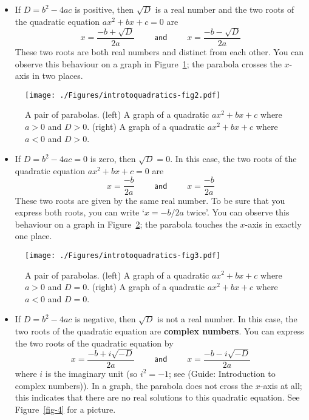 \documentclass[
  12pt,
  a4paper, oneside]{starmastarticle}
\providecommand{\tightlist}{%
  \setlength{\itemsep}{0pt}\setlength{\parskip}{0pt}}\usepackage{longtable,booktabs,array}
\begin{document}
\begin{itemize}
\tightlist
\item
  If \(D = b^2 - 4ac\) is positive, then \(\sqrt{D}\) is a real number
  and the two roots of the quadratic equation \(ax^2 + bx + c = 0\) are
  \[x = \frac{-b + \sqrt{D}}{2a}\qquad\textsf{ and }\qquad x = \frac{-b - \sqrt{D}}{2a}\]
  These two roots are both real numbers and distinct from each other.
  You can observe this behaviour on a graph in Figure~\ref{fig-2}; the
  parabola crosses the \(x\)-axis in two places.
\end{itemize}

\begin{figure}

{\centering \texttt{[image: ./Figures/introtoquadratics-fig2.pdf]}

}

\caption{\label{fig-2}A pair of parabolas. (left) A graph of a quadratic
\(ax^2 + bx + c\) where \(a > 0\) and \(D > 0\). (right) A graph of a
quadratic \(ax^2 + bx + c\) where \(a < 0\) and \(D > 0\).}

\end{figure}

\begin{itemize}
\tightlist
\item
  If \(D = b^2 - 4ac = 0\) is zero, then \(\sqrt{D} = 0\). In this case,
  the two roots of the quadratic equation \(ax^2 + bx + c = 0\) are
  \[x = \frac{-b}{2a} \qquad\textsf{ and }\qquad x = \frac{-b}{2a}\]
  These two roots are given by the same real number. To be sure that you
  express both roots, you can write `\(x = -b/2a\) twice'. You can
  observe this behaviour on a graph in Figure~\ref{fig-3}; the parabola
  touches the \(x\)-axis in exactly one place.
\end{itemize}

\begin{figure}

{\centering \texttt{[image: ./Figures/introtoquadratics-fig3.pdf]}

}

\caption{\label{fig-3}A pair of parabolas. (left) A graph of a quadratic
\(ax^2 + bx + c\) where \(a > 0\) and \(D = 0\). (right) A graph of a
quadratic \(ax^2 + bx + c\) where \(a < 0\) and \(D = 0\).}

\end{figure}

\begin{itemize}
\tightlist
\item
  If \(D = b^2 - 4ac\) is negative, then \(\sqrt{D}\) is not a real
  number. In this case, the two roots of the quadratic equation are
  \textbf{complex numbers}. You can express the two roots of the
  quadratic equation by
  \[x = \frac{-b + i\sqrt{-D}}{2a}\qquad\textsf{ and }\qquad x = \frac{-b - i\sqrt{-D}}{2a}\]
  where \(i\) is the imaginary unit (so \(i^2 = -1\); see (Guide:
  Introduction to complex numbers)). In a graph, the parabola does not
  cross the \(x\)-axis at all; this indicates that there are no real
  solutions to this quadratic equation. See Figure~\ref{fig-4} for a
  picture.
\end{itemize}
\end{document}
